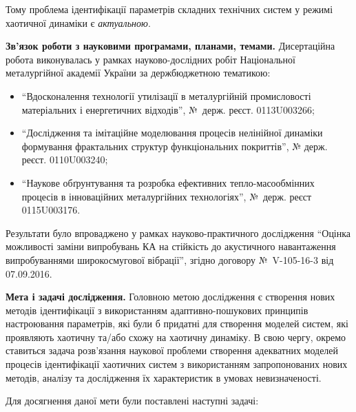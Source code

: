 \documentclass[a4paper,13pt]{atuaref}
\begin{document}
Тому проблема
ідентифікації параметрів складних технічних систем у режимі хаотичної динаміки
є \textit{актуальною}.

\smallskip
\textbf{Зв'язок роботи з науковими програмами, планами, темами.}
Дисертаційна робота виконувалась у рамках науково-дослідних робіт
Національної металургійної академії України за держбюджетною
тематикою:

\begin{itemize}


\item
  ``Вдосконалення технології утилізації в металургійній промисловості
  матеріальних і енергетичних відходів'', №~держ. реєст. 0113U003266;

  \item
  ``Дослідження та імітаційне моделювання процесів нелінійної динаміки
  формування фрактальних структур функціональних   покриттів'',
  № держ. реєст. 0110U003240;

  \item
  ``Наукове обґрунтування та розробка ефективних тепло-масообмінних
  процесів в інноваційних металургійних технологіях'', №~держ. реєст 0115U003176.

\end{itemize}

Результати було впроваджено у рамках науково-практичного дослідження
``Оцінка можливості заміни випробувань КА на стійкість до акустичного навантаження
випробуваннями широкосмугової вібрації'', згідно договору \hbox{№~V-105-16-3} від 07.09.2016.

\textbf{Мета і задачі дослідження.}
Головною метою дослідження є створення нових методів ідентифікації з
використанням адаптивно-пошукових принципів настроювання параметрів, які
були б придатні для створення моделей систем, які проявляють хаотичну
та/або схожу на хаотичну динаміку. В свою чергу, окремо ставиться задача
розв'язання наукової проблеми створення адекватних моделей процесів
ідентифікації хаотичних систем з використанням запропонованих нових
методів, аналізу та дослідження їх характеристик в умовах невизначеності.

Для досягнення даної мети були поставлені наступні задачі:
\end{document}

